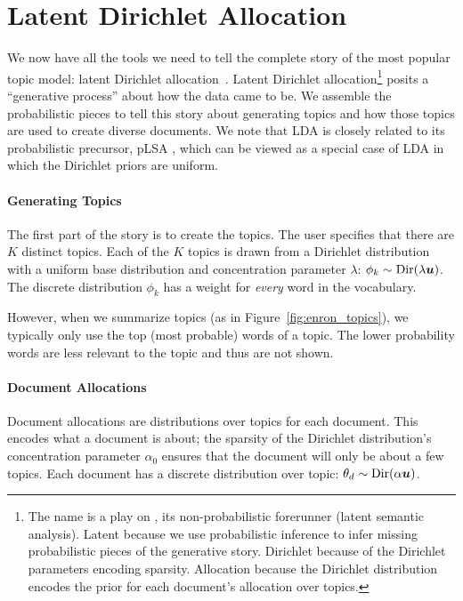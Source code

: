 \section{Latent Dirichlet Allocation}
\label{sec:lda}

We now have all the tools we need to tell the complete story of the most popular topic model: latent Dirichlet allocation~\citep{blei-03}.  Latent
Dirichlet allocation\footnote{The name  is a play on , its
  non-probabilistic forerunner (latent semantic analysis).  Latent because we
  use probabilistic inference to infer missing probabilistic pieces of the
  generative story.  Dirichlet because of the Dirichlet parameters encoding
  sparsity.  Allocation because the Dirichlet distribution encodes the prior for
  each document's allocation over topics.} posits a ``generative process'' about
how the data came to be.  We assemble the probabilistic pieces to tell
this story about generating topics and how those topics are used to create
diverse documents.
We note that LDA is closely related to its probabilistic precursor, pLSA \cite{hofmann-99}, which can be viewed as a special case of LDA in which the Dirichlet priors are uniform.

\paragraph{Generating Topics}

The first part of the story is to create the topics.  The user specifies that
there are $K$ distinct topics.  Each of the $K$ topics is drawn from a Dirichlet
distribution with a uniform base distribution and concentration parameter
$\lambda$: $\phi_k \sim \mbox{Dir}(\lambda {\bm u})$.  The discrete distribution
$\phi_k$ has a weight for \emph{every} word in the vocabulary.

However, when we summarize topics (as in
Figure~\ref{fig:enron_topics}), we typically only use the top (most probable) words of
a topic.  The lower probability words are less relevant to the topic
and thus are not shown.

\paragraph{Document Allocations}

Document allocations are distributions over topics for each document.  This
encodes what a document is about; the sparsity of the Dirichlet distribution's
concentration parameter $\alpha_0$ ensures that the document will only be about a
few topics.  Each document has a discrete distribution over topic: $\theta_d \sim
\mbox{Dir}(\alpha {\bm u})$.

